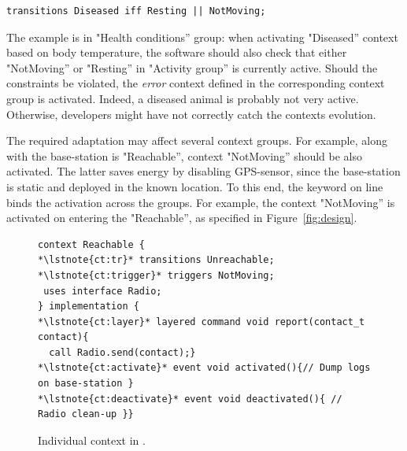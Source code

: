 \vspace{-1mm}
\begin{lstlisting}[language=conesc]
transitions Diseased iff Resting || NotMoving;
\end{lstlisting}
\vspace{-1.5mm}

The example is in "Health conditions'' group: when activating "Diseased''
context based on body temperature, the software should also check that either
"NotMoving'' or "Resting'' in "Activity group'' is currently active. Should the
constraints be violated, the \emph{error} context defined in the corresponding context
group is activated. Indeed, a diseased animal is probably not very active.
Otherwise, developers might have not correctly catch the contexts
evolution.

The required adaptation may affect several context groups. For example, along
with the base-station is "Reachable'', context "NotMoving'' should be also
activated. The latter saves energy by disabling GPS-sensor, since the
base-station is static and deployed in the known location. To this end,
the keyword  on line~ binds the activation
across the groups. For example, the context "NotMoving'' is activated on
entering the "Reachable'', as specified in Figure~\ref{fig:design}.


\begin{figure}[!tb]
\begin{lstlisting}[style=conescframe]
context Reachable {
*\lstnote{ct:tr}* transitions Unreachable;
*\lstnote{ct:trigger}* triggers NotMoving;
 uses interface Radio;
} implementation {
*\lstnote{ct:layer}* layered command void report(contact_t contact){
  call Radio.send(contact);}
*\lstnote{ct:activate}* event void activated(){// Dump logs on base-station }
*\lstnote{ct:deactivate}* event void deactivated(){ // Radio clean-up }}
\end{lstlisting}
\caption{Individual context in \conesc.}
  \label{fig:context}
\vspace{-5mm}
\end{figure}
